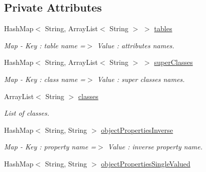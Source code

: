 \subsection*{Private Attributes}
\begin{DoxyCompactItemize}
\item 
HashMap$<$ String, ArrayList$<$ String $>$ $>$ \hyperlink{class_classes_c_p_p_1_1_dao_generator_aac7347b462abcc6c13537cb2742db47a}{tables}
\begin{DoxyCompactList}\small\item\em Map -\/ Key : table name =$>$ Value : attributes names. \end{DoxyCompactList}\item 
HashMap$<$ String, ArrayList$<$ String $>$ $>$ \hyperlink{class_classes_c_p_p_1_1_dao_generator_a82c17c8ceb0920fdb5550acd119418e3}{superClasses}
\begin{DoxyCompactList}\small\item\em Map -\/ Key : class name =$>$ Value : super classes names. \end{DoxyCompactList}\item 
\hypertarget{class_classes_c_p_p_1_1_dao_generator_a1d8a1ed16c117296a86cf50de991f6c3}{
ArrayList$<$ String $>$ \hyperlink{class_classes_c_p_p_1_1_dao_generator_a1d8a1ed16c117296a86cf50de991f6c3}{classes}}
\label{class_classes_c_p_p_1_1_dao_generator_a1d8a1ed16c117296a86cf50de991f6c3}

\begin{DoxyCompactList}\small\item\em List of classes. \end{DoxyCompactList}\item 
\hypertarget{class_classes_c_p_p_1_1_dao_generator_abe833faf455358b4acfbb6094a79aac2}{
HashMap$<$ String, String $>$ \hyperlink{class_classes_c_p_p_1_1_dao_generator_abe833faf455358b4acfbb6094a79aac2}{objectPropertiesInverse}}
\label{class_classes_c_p_p_1_1_dao_generator_abe833faf455358b4acfbb6094a79aac2}

\begin{DoxyCompactList}\small\item\em Map -\/ Key : property name =$>$ Value : inverse property name. \end{DoxyCompactList}\item 
\hypertarget{class_classes_c_p_p_1_1_dao_generator_a3173466faa066f9caea2e5dcaba3b330}{
HashMap$<$ String, String $>$ \hyperlink{class_classes_c_p_p_1_1_dao_generator_a3173466faa066f9caea2e5dcaba3b330}{objectPropertiesSingleValued}}
\label{class_classes_c_p_p_1_1_dao_generator_a3173466faa066f9caea2e5dcaba3b330}


\end{DoxyCompactItemize}
